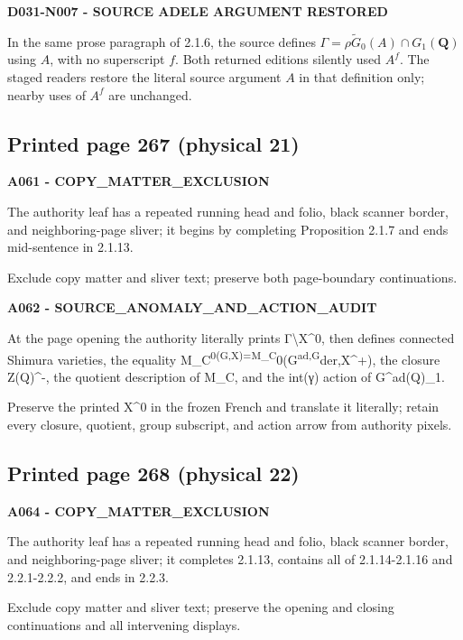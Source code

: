 \documentclass[10pt,a4paper]{article}
\begin{document}
\textbf{D031-N007 - SOURCE ADELE ARGUMENT RESTORED}

In the same prose paragraph of 2.1.6, the source defines \(\Gamma=\rho\widetilde G_0(A)\cap G_1(\mathbf Q)\) using \(A\), with no superscript \(f\). Both returned editions silently used \(A^f\). The staged readers restore the literal source argument \(A\) in that definition only; nearby uses of \(A^f\) are unchanged.

\subsection{Printed page 267 (physical 21)}

\textbf{A061 - COPY\_MATTER\_EXCLUSION}

The authority leaf has a repeated running head and folio, black scanner border, and neighboring-page sliver; it begins by completing Proposition 2.1.7 and ends mid-sentence in 2.1.13.

Exclude copy matter and sliver text; preserve both page-boundary continuations.

\textbf{A062 - SOURCE\_ANOMALY\_AND\_ACTION\_AUDIT}

At the page opening the authority literally prints Γ\textbackslash X\^{}0, then defines connected Shimura varieties, the equality M\_C\textsuperscript{0(G,X)=M\_C}0(G\textsuperscript{ad,G}der,X\^{}+), the closure Z(Q)\^{}-, the quotient description of M\_C, and the int(γ) action of G\^{}ad(Q)\_1.

Preserve the printed X\^{}0 in the frozen French and translate it literally; retain every closure, quotient, group subscript, and action arrow from authority pixels.

\subsection{Printed page 268 (physical 22)}

\textbf{A064 - COPY\_MATTER\_EXCLUSION}

The authority leaf has a repeated running head and folio, black scanner border, and neighboring-page sliver; it completes 2.1.13, contains all of 2.1.14-2.1.16 and 2.2.1-2.2.2, and ends in 2.2.3.

Exclude copy matter and sliver text; preserve the opening and closing continuations and all intervening displays.
\end{document}
